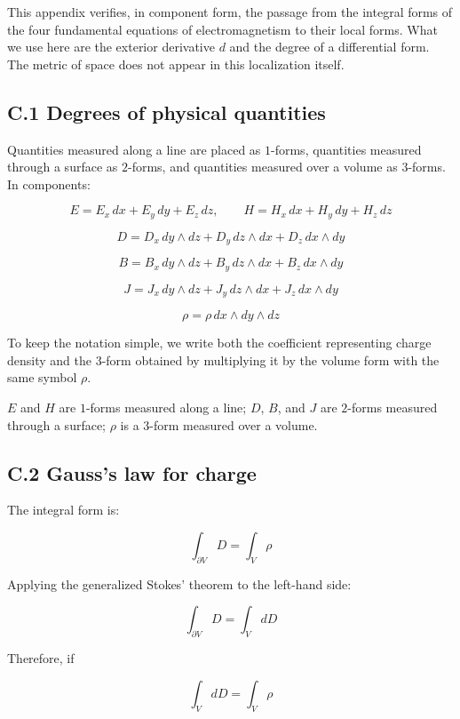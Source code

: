 This appendix verifies, in component form, the passage from the integral
forms of the four fundamental equations of electromagnetism to their
local forms. What we use here are the exterior derivative \(d\) and the
degree of a differential form. The metric of space does not appear in
this localization itself.

\hypertarget{c.1-degrees-of-physical-quantities}{%
\subsection{C.1 Degrees of physical
quantities}\label{c.1-degrees-of-physical-quantities}}

Quantities measured along a line are placed as \(1\)-forms, quantities
measured through a surface as \(2\)-forms, and quantities measured over
a volume as \(3\)-forms. In components:

\[
E = E_x\,dx+E_y\,dy+E_z\,dz,
\qquad
H = H_x\,dx+H_y\,dy+H_z\,dz
\]

\[D = D_x\,dy\wedge dz + D_y\,dz\wedge dx + D_z\,dx\wedge dy\]

\[B = B_x\,dy\wedge dz + B_y\,dz\wedge dx + B_z\,dx\wedge dy\]

\[J = J_x\,dy\wedge dz + J_y\,dz\wedge dx + J_z\,dx\wedge dy\]

\[
\rho = \rho\,dx\wedge dy\wedge dz
\]

To keep the notation simple, we write both the coefficient representing
charge density and the \(3\)-form obtained by multiplying it by the
volume form with the same symbol \(\rho\).

\(E\) and \(H\) are \(1\)-forms measured along a line; \(D\), \(B\), and
\(J\) are \(2\)-forms measured through a surface; \(\rho\) is a
\(3\)-form measured over a volume.

\hypertarget{c.2-gausss-law-for-charge}{%
\subsection{C.2 Gauss's law for
charge}\label{c.2-gausss-law-for-charge}}

The integral form is:

\[
\int_{\partial V}D=\int_V\rho
\]

Applying the generalized Stokes' theorem to the left-hand side:

\[
\int_{\partial V}D=\int_V dD
\]

Therefore, if

\[
\int_V dD=\int_V\rho
\]

